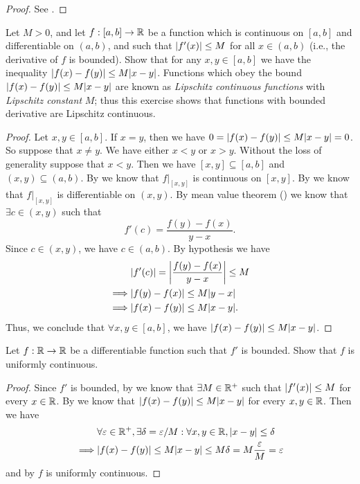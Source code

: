 \begin{proof}
  See .
\end{proof}

\begin{ex}\label{i:ex:10.2.6}
  Let \(M > 0\), and let \(f : [a, b] \to \mathbb{R}\) be a function which is continuous on \([a, b]\) and differentiable on \((a, b)\), and such that \(\left\lvert f'(x)\right\rvert \leq M\) for all \(x \in (a, b)\) (i.e., the derivative of \(f\) is bounded).
  Show that for any \(x, y \in [a, b]\) we have the inequality \(\abs{f(x) - f(y)} \leq M \abs{x - y}\).
  Functions which obey the bound \(\abs{f(x) - f(y)} \leq M \abs{x - y}\) are known as \emph{Lipschitz continuous functions} with \emph{Lipschitz constant} \(M\);
  thus this exercise shows that functions with bounded derivative are Lipschitz continuous.
\end{ex}

\begin{proof}
  Let \(x, y \in [a, b]\).
  If \(x = y\), then we have \(0 = \abs{f(x) - f(y)} \leq M \abs{x - y} = 0\).
  So suppose that \(x \neq y\).
  We have either \(x < y\) or \(x > y\).
  Without the loss of generality suppose that \(x < y\).
  Then we have \([x, y] \subseteq [a, b]\) and \((x, y) \subseteq (a, b)\).
  By  we know that \(f|_{[x, y]}\) is continuous on \([x, y]\).
  By  we know that \(f|_{[x, y]}\) is differentiable on \((x, y)\).
  By mean value theorem () we know that \(\exists c \in (x, y)\) such that
  \[
    f'(c) = \dfrac{f(y) - f(x)}{y - x}.
  \]
  Since \(c \in (x, y)\), we have \(c \in (a, b)\).
  By hypothesis we have
  \begin{align*}
             & \abs{f'(c)} = \abs{\dfrac{f(y) - f(x)}{y - x}} \leq M \\
    \implies & \abs{f(y) - f(x)} \leq M \abs{y - x}                  \\
    \implies & \abs{f(x) - f(y)} \leq M \abs{x - y}.
  \end{align*}
  Thus, we conclude that \(\forall x, y \in [a, b]\), we have \(\abs{f(x) - f(y)} \leq M \abs{x - y}\).
\end{proof}

\begin{ex}\label{i:ex:10.2.7}
  Let \(f : \mathbb{R} \to \mathbb{R}\) be a differentiable function such that \(f'\) is bounded.
  Show that \(f\) is uniformly continuous.
\end{ex}

\begin{proof}
  Since \(f'\) is bounded, by  we know that \(\exists M \in \mathbb{R}^+\) such that \(\left\lvert f'(x)\right\rvert \leq M\) for every \(x \in \mathbb{R}\).
  By  we know that \(\abs{f(x) - f(y)} \leq M \abs{x - y}\) for every \(x, y \in \mathbb{R}\).
  Then we have
  \begin{align*}
             & \forall \varepsilon \in \R^+, \exists \delta = \varepsilon / M : \forall x, y \in \R, \abs{x - y} \leq \delta \\
    \implies & \abs{f(x) - f(y)} \leq M \abs{x - y} \leq M \delta = M \dfrac{\varepsilon}{M} = \varepsilon
  \end{align*}
  and by  \(f\) is uniformly continuous.
\end{proof}

